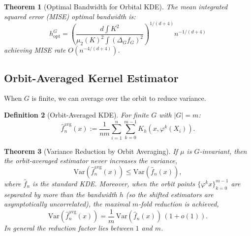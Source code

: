 \documentclass[11pt]{article}
\newtheorem{theorem}{Theorem}[section]
\newtheorem{definition}[theorem]{Definition}
\newcommand{\Var}{\mathrm{Var}}
\begin{document}
\begin{theorem}[Optimal Bandwidth for Orbital KDE]\label{thm:kde_optimal}
The mean integrated squared error (MISE) optimal bandwidth is:
\begin{equation}\label{eq:optimal_bandwidth}
h_{\mathrm{opt}}^G = \left( \frac{d \int K^2}{\mu_2(K)^2 \int (\Delta_G f_G)^2} \right)^{1/(d+4)} n^{-1/(d+4)}
\end{equation}
achieving MISE rate $O(n^{-4/(d+4)})$.
\end{theorem}

\subsection{Orbit-Averaged Kernel Estimator}

When $G$ is finite, we can average over the orbit to reduce variance.

\begin{definition}[Orbit-Averaged KDE]\label{def:orbit_averaged_kde}
For finite $G$ with $|G| = m$:
\begin{equation}\label{eq:orbit_averaged_kde}
\hat{f}_n^{\mathrm{avg}}(x) := \frac{1}{nm} \sum_{i=1}^n \sum_{k=0}^{m-1} K_h(x, \varphi^k(X_i)).
\end{equation}
\end{definition}

\begin{theorem}[Variance Reduction by Orbit Averaging]\label{thm:orbit_averaging}
If $\mu$ is $G$-invariant, then the orbit-averaged estimator never increases the variance,
\begin{equation}\label{eq:variance_reduction}
\Var(\hat{f}_n^{\mathrm{avg}}(x)) \leq \Var(\hat{f}_n(x)),
\end{equation}
where $\hat{f}_n$ is the standard KDE. Moreover, when the orbit points $\{\varphi^k x\}_{k=0}^{m-1}$ are separated by more than the bandwidth $h$ (so the shifted estimators are asymptotically uncorrelated), the maximal $m$-fold reduction is achieved,
\begin{equation}\label{eq:variance_reduction_best}
\Var(\hat{f}_n^{\mathrm{avg}}(x)) = \frac{1}{m}\,\Var(\hat{f}_n(x))\,(1+o(1)).
\end{equation}
In general the reduction factor lies between $1$ and $m$.
\end{theorem}
\end{document}
